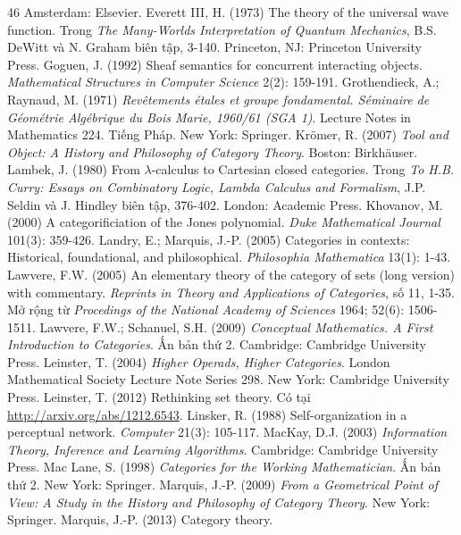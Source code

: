 \begin{thebibliography}{46}
Amsterdam: Elsevier.
 Everett III, H. (1973) The theory of the universal wave function.
Trong \emph{The Many-Worlds Interpretation of Quantum Mechanics},
B.S. DeWitt và N. Graham biên tập, 3-140. Princeton, NJ:
Princeton University Press.
 Goguen, J. (1992) Sheaf semantics for concurrent interacting
objects. \emph{Mathematical Structures in Computer Science} 2(2): 159-191.
 Grothendieck, A.; Raynaud, M. (1971)
\emph{Revêtements étales et groupe fondamental. Séminaire de Géométrie
Algébrique du Bois Marie, 1960/61 (SGA 1)}. Lecture Notes in Mathematics 224.
Tiếng Pháp. New York: Springer.
 Krömer, R. (2007) \emph{Tool and Object: A History and Philosophy
of Category Theory}. Boston: Birkhäuser.
 Lambek, J. (1980) From $\lambda$-calculus to Cartesian closed
categories. Trong \emph{To H.B. Curry: Essays on Combinatory Logic, Lambda
Calculus and Formalism}, J.P. Seldin và J. Hindley biên tập, 376-402.
London: Academic Press.
 Khovanov, M. (2000) A categorificiation of the Jones polynomial.
\emph{Duke Mathematical Journal} 101(3): 359-426.
 Landry, E.; Marquis, J.-P. (2005) Categories in contexts:
Historical, foundational, and philosophical. \emph{Philosophia Mathematica}
13(1): 1-43.
 Lawvere, F.W. (2005) An elementary theory of the category of sets
(long version) with commentary. \emph{Reprints in Theory and Applications of
Categories}, số 11, 1-35. Mở rộng từ \emph{Procedings of the National Academy
of Sciences} 1964; 52(6): 1506-1511.
 Lawvere, F.W.; Schanuel, S.H. (2009)
\emph{Conceptual Mathematics. A First Introduction to Categories}.
Ấn bản thứ 2. Cambridge: Cambridge University Press.
 Leinster, T. (2004) \emph{Higher Operads, Higher Categories}.
London Mathematical Society Lecture Note Series 298.
New York: Cambridge University Press.
 Leinster, T. (2012) Rethinking set theory.
Có tại \url{http://arxiv.org/abs/1212.6543}.
 Linsker, R. (1988) Self-organization in a perceptual network.
\emph{Computer} 21(3): 105-117.
 MacKay, D.J. (2003)
\emph{Information Theory, Inference and Learning Algorithms}.
Cambridge: Cambridge University Press.
 Mac Lane, S. (1998)
\emph{Categories for the Working Mathematician}. Ấn bản thứ 2.
New York: Springer.
 Marquis, J.-P. (2009) \emph{From a Geometrical Point of View:
A Study in the History and Philosophy of Category Theory}.
New York: Springer.
 Marquis, J.-P. (2013) Category theory.

\end{thebibliography}
